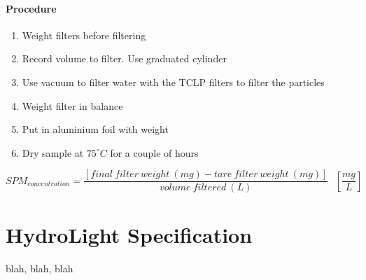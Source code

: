\begin{appendices}
\subsubsection{{\color{red} Procedure}}
\begin{enumerate}
  \item Weight filters before filtering
  \item Record volume to filter. Use graduated cylinder
  \item Use vacuum to filter water with the TCLP filters to filter the particles
  \item Weight filter in balance
  \item Put in aluminium foil with weight
  \item Dry sample at $75^\circ C$ for a couple of hours
\end{enumerate}


\begin{equation}
SPM_{\displaystyle concentration} = \frac{[final~filter~weight~(mg) - tare~filter~weight~(mg)]}{volume~filtered~(L)}~~~\left[\frac{mg}{L}\right]
\end{equation}



\chapter{HydroLight Specification}

blah, blah, blah

\end{appendices}